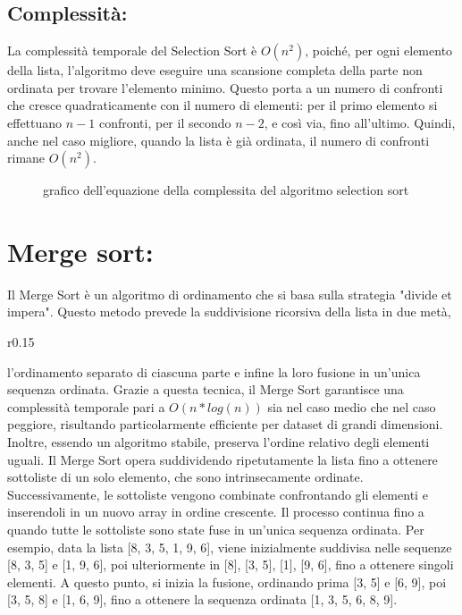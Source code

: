 \documentclass[a4paper]{article}
\begin{document}
\subsection{Complessità:}
La complessità temporale del Selection Sort è \(O(n^2)\), poiché, per ogni elemento della lista, l'algoritmo deve eseguire una scansione completa della 
parte non ordinata per trovare l'elemento minimo. Questo porta a un numero di confronti che cresce quadraticamente con il numero di elementi: per il primo elemento 
si effettuano \(n-1\) confronti, per il secondo \(n-2\), e così via, fino all'ultimo. Quindi, anche nel caso migliore, quando la lista è già ordinata, il numero di 
confronti rimane \(O(n^2)\). 
\begin{figure}[h]
    \caption{grafico dell'equazione della complessita del algoritmo selection sort}
\end{figure}

\section{Merge sort:}
Il Merge Sort è un algoritmo di ordinamento che si basa sulla strategia "divide et impera". Questo metodo prevede la suddivisione ricorsiva della lista in due metà,
\begin{wrapfigure}{r}{0.15\textwidth}
    \begin{center}
    \end{center}
\end{wrapfigure}
l'ordinamento separato di ciascuna parte e infine la loro fusione in un'unica sequenza ordinata. Grazie a questa tecnica, il Merge Sort garantisce una complessità 
temporale pari a \(O(n*log(n))\) sia nel caso medio che nel caso peggiore, risultando particolarmente efficiente per dataset di grandi dimensioni. Inoltre, essendo un 
algoritmo stabile, preserva l'ordine relativo degli elementi uguali.
Il Merge Sort opera suddividendo ripetutamente la lista fino a ottenere sottoliste di un solo elemento, che sono intrinsecamente ordinate. Successivamente, 
le sottoliste vengono combinate confrontando gli elementi e inserendoli in un nuovo array in ordine crescente. Il processo continua fino a quando tutte le 
sottoliste sono state fuse in un’unica sequenza ordinata. Per esempio, data la lista [8, 3, 5, 1, 9, 6], viene inizialmente suddivisa nelle sequenze [8, 3, 5] 
e [1, 9, 6], poi ulteriormente in [8], [3, 5], [1], [9, 6], fino a ottenere singoli elementi. A questo punto, si inizia la fusione, ordinando prima [3, 5] e [6, 9], 
poi [3, 5, 8] e [1, 6, 9], fino a ottenere la sequenza ordinata [1, 3, 5, 6, 8, 9].
\end{document}
